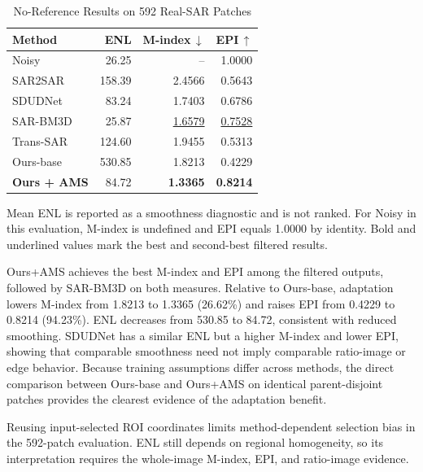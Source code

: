 \documentclass[conference]{IEEEtran}
\begin{document}
\begin{table}[!htbp]
\caption{No-Reference Results on 592 Real-SAR Patches}
\label{tab:real}
\centering
\footnotesize
\setlength{\tabcolsep}{3.0pt}
\renewcommand{\arraystretch}{1.08}
\begin{tabular*}{\columnwidth}{@{\extracolsep{\fill}}lrrr@{}}
\toprule
\textbf{Method} & \textbf{ENL} & \textbf{M-index}\,$\downarrow$ & \textbf{EPI}\,$\uparrow$ \\
\midrule
Noisy       & 26.25  & --                 & 1.0000 \\
SAR2SAR     & 158.39 & 2.4566             & 0.5643 \\
SDUDNet     & 83.24  & 1.7403             & 0.6786 \\
SAR-BM3D    & 25.87  & \underline{1.6579} & \underline{0.7528} \\
Trans-SAR   & 124.60 & 1.9455             & 0.5313 \\
Ours-base   & 530.85 & 1.8213             & 0.4229 \\
\textbf{Ours + AMS} & 84.72 & \textbf{1.3365} & \textbf{0.8214} \\
\bottomrule
\end{tabular*}
\vspace{1pt}
\parbox{\columnwidth}{\scriptsize\raggedright Mean ENL is reported as a smoothness diagnostic and is not ranked. For Noisy in this evaluation, M-index is undefined and EPI equals 1.0000 by identity. Bold and underlined values mark the best and second-best filtered results.}
\end{table}

Ours+AMS achieves the best M-index and EPI among the filtered outputs, followed by SAR-BM3D on both measures. Relative to Ours-base, adaptation lowers M-index from 1.8213 to 1.3365 (26.62\%) and raises EPI from 0.4229 to 0.8214 (94.23\%). ENL decreases from 530.85 to 84.72, consistent with reduced smoothing. SDUDNet has a similar ENL but a higher M-index and lower EPI, showing that comparable smoothness need not imply comparable ratio-image or edge behavior. Because training assumptions differ across methods, the direct comparison between Ours-base and Ours+AMS on identical parent-disjoint patches provides the clearest evidence of the adaptation benefit.

Reusing input-selected ROI coordinates limits method-dependent selection bias in the 592-patch evaluation. ENL still depends on regional homogeneity, so its interpretation requires the whole-image M-index, EPI, and ratio-image evidence.
\end{document}
